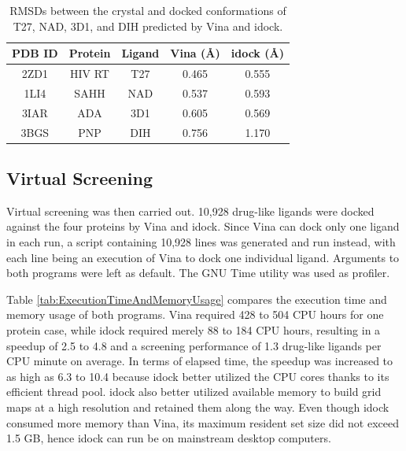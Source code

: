 \documentclass[10pt, conference, compsocconf]{IEEEtran}
\begin{document}
\begin{table}
\centering
\begin{tabular*}
{\linewidth}
{@{\extracolsep{\fill}}ccccc}
\toprule
PDB ID & Protein & Ligand & Vina (\AA) & idock (\AA)\\
\midrule
2ZD1 & HIV RT & T27 & 0.465 & 0.555\\
1LI4 & SAHH   & NAD & 0.537 & 0.593\\
3IAR & ADA    & 3D1 & 0.605 & 0.569\\
3BGS & PNP    & DIH & 0.756 & 1.170\\
\bottomrule
\end{tabular*}
\caption{RMSDs between the crystal and docked conformations of T27, NAD, 3D1, and DIH predicted by Vina and idock.}
\label{tab:RMSD}
\end{table}

\subsection{Virtual Screening}

Virtual screening was then carried out. 10,928 drug-like ligands were docked against the four proteins by Vina and idock. Since Vina can dock only one ligand in each run, a script containing 10,928 lines was generated and run instead, with each line being an execution of Vina to dock one individual ligand. Arguments to both programs were left as default. The GNU Time utility was used as profiler.

Table \ref{tab:ExecutionTimeAndMemoryUsage} compares the execution time and memory usage of both programs. Vina required 428 to 504 CPU hours for one protein case, while idock required merely 88 to 184 CPU hours, resulting in a speedup of 2.5 to 4.8 and a screening performance of 1.3 drug-like ligands per CPU minute on average. In terms of elapsed time, the speedup was increased to as high as 6.3 to 10.4 because idock better utilized the CPU cores thanks to its efficient thread pool. idock also better utilized available memory to build grid maps at a high resolution and retained them along the way. Even though idock consumed more memory than Vina, its maximum resident set size did not exceed 1.5 GB, hence idock can run be on mainstream desktop computers.
\end{document}

